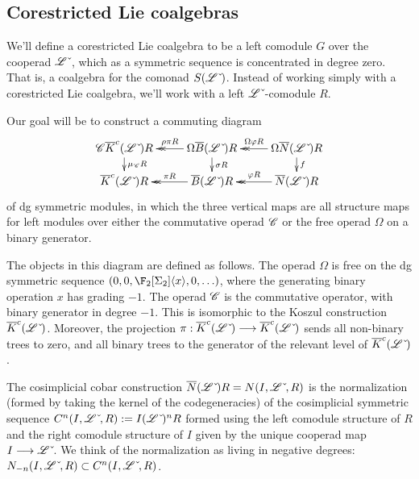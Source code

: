 \documentclass[10pt]{article}
\newcommand{\dual}{\,\check{\,}}
\newcommand{\LieOperad}{\scrL}
\newcommand{\dualLieOperad}{\LieOperad\dual}
\newcommand{\CommOperad}{\scrC}
\begin{document}
\begin{PRlieKoszulComplexCalculation}

\subsection{Corestricted Lie coalgebras }
We'll define a corestricted Lie coalgebra to be a left comodule $G$ over the cooperad $\dualLieOperad$, which as a symmetric sequence is concentrated in degree zero. That is, a coalgebra for the comonad $S(\dualLieOperad)$. Instead of working simply with a corestricted Lie coalgebra, we'll work with a left $\dualLieOperad$-comodule $R$.

Our goal will be to construct a commuting diagram
\[\xymatrix@R=4mm{
\CommOperad\circ \overline{K}^c(\dualLieOperad)\circ R
\ar[d]^-{\mu_{\CommOperad}\circ R}
&%
\Omega\circ \overline{B}(\dualLieOperad)\circ R
\ar@{->>}[l]_-{\rho\circ\pi\circ R}
\ar[d]^-{\sigma\circ R}
&%
\Omega\circ \overline{N}(\dualLieOperad)\circ R
\ar[d]^-{f}
\ar@{->>}[l]_-{\Omega\circ\oldphi\circ R}
\\%
\overline{K}^c(\dualLieOperad)\circ R
&%
\overline{B}(\dualLieOperad)\circ R
\ar@{->>}[l]_-{\pi\circ R}
&%
\overline{N}(\dualLieOperad)\circ R
\ar@{->>}[l]_-{\oldphi\circ R}
}\]
of dg symmetric modules, in which the three vertical maps are all structure maps for left modules over either the commutative operad $\CommOperad$ or the free operad $\Omega$ on a binary generator.

The objects in this diagram are defined as follows. The operad $\Omega$ is free on the dg symmetric sequence $(0,0,\F_2[\Sigma_2]\langle x\rangle,0,\ldots)$, where the generating binary operation $x$ has grading $-1$. The operad $\CommOperad$ is the commutative operator, with binary generator in degree $-1$.  This is isomorphic to the Koszul construction $\overline{K}^c(\dualLieOperad)$. Moreover, the projection $\pi:\overline{K}^c(\dualLieOperad)\to \overline{K}^c(\dualLieOperad)$ sends all non-binary trees to zero, and all binary trees to the generator of the relevant level of $\overline{K}^c(\dualLieOperad)$.

The cosimplicial cobar construction $\overline{N}(\dualLieOperad)\circ R=N(I,\dualLieOperad,R)$ is the  normalization (formed by taking the kernel of the codegeneracies) of the cosimplicial symmetric sequence $C^n(I,\dualLieOperad,R):=I\circ (\dualLieOperad)^{\circ n}\circ R$ formed using the left comodule structure of $R$ and the right comodule structure of $I$ given by the unique cooperad map $I\to \dualLieOperad$. We think of the normalization as living in negative degrees: $N_{-n}(I,\dualLieOperad,R)\subset C^n(I,\dualLieOperad,R)$.


\end{PRlieKoszulComplexCalculation}
\end{document}
